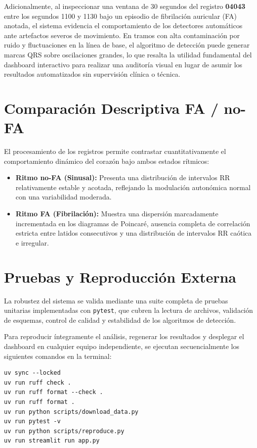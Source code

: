 \documentclass[11pt,a4paper]{article}
\begin{document}
Adicionalmente, al inspeccionar una ventana de 30 segundos del registro \textbf{04043} entre los segundos 1100 y 1130 bajo un episodio de fibrilación auricular (FA) anotada, el sistema evidencia el comportamiento de los detectores automáticos ante artefactos severos de movimiento. En tramos con alta contaminación por ruido y fluctuaciones en la línea de base, el algoritmo de detección puede generar marcas QRS sobre oscilaciones grandes, lo que resalta la utilidad fundamental del dashboard interactivo para realizar una auditoría visual en lugar de asumir los resultados automatizados sin supervisión clínica o técnica.

\section{Comparación Descriptiva FA / no-FA}
El procesamiento de los registros permite contrastar cuantitativamente el comportamiento dinámico del corazón bajo ambos estados rítmicos:
\begin{itemize}
    \item \textbf{Ritmo no-FA (Sinusal):} Presenta una distribución de intervalos RR relativamente estable y acotada, reflejando la modulación autonómica normal con una variabilidad moderada.
    \item \textbf{Ritmo FA (Fibrilación):} Muestra una dispersión marcadamente incrementada en los diagramas de Poincaré, ausencia completa de correlación estricta entre latidos consecutivos y una distribución de intervalos RR caótica e irregular.
\end{itemize}

\section{Pruebas y Reproducción Externa}
La robustez del sistema se valida mediante una suite completa de pruebas unitarias implementadas con \texttt{pytest}, que cubren la lectura de archivos, validación de esquemas, control de calidad y estabilidad de los algoritmos de detección. 

Para reproducir íntegramente el análisis, regenerar los resultados y desplegar el dashboard en cualquier equipo independiente, se ejecutan secuencialmente los siguientes comandos en la terminal:

\begin{verbatim}
uv sync --locked
uv run ruff check .
uv run ruff format --check .
uv run ruff format .
uv run python scripts/download_data.py
uv run pytest -v
uv run python scripts/reproduce.py
uv run streamlit run app.py
\end{verbatim}
\end{document}
